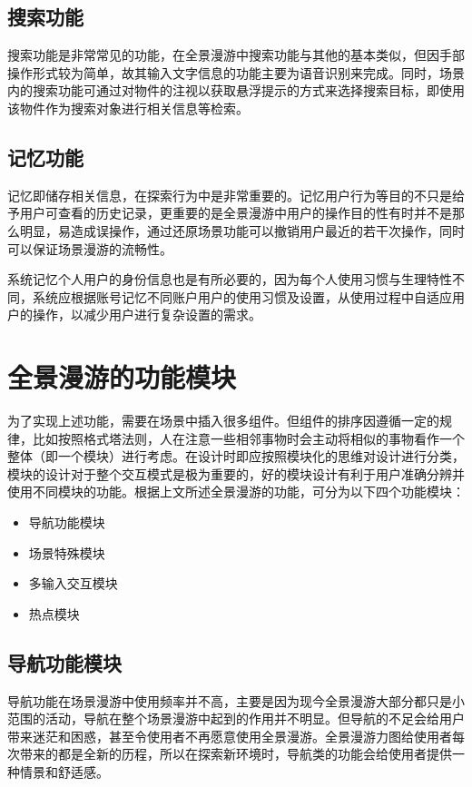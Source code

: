 \subsection{搜索功能}
搜索功能是非常常见的功能，在全景漫游中搜索功能与其他的基本类似，但因手部操作形式较为简单，故其输入文字信息的功能主要为语音识别来完成。同时，场景内的搜索功能可通过对物件的注视以获取悬浮提示的方式来选择搜索目标，即使用该物件作为搜索对象进行相关信息等检索。

\subsection{记忆功能}
记忆即储存相关信息，在探索行为中是非常重要的。记忆用户行为等目的不只是给予用户可查看的历史记录，更重要的是全景漫游中用户的操作目的性有时并不是那么明显，易造成误操作，通过还原场景功能可以撤销用户最近的若干次操作，同时可以保证场景漫游的流畅性。

系统记忆个人用户的身份信息也是有所必要的，因为每个人使用习惯与生理特性不同，系统应根据账号记忆不同账户用户的使用习惯及设置，从使用过程中自适应用户的操作，以减少用户进行复杂设置的需求。


\section{全景漫游的功能模块}
为了实现上述功能，需要在场景中插入很多组件。但组件的排序因遵循一定的规律，比如按照格式塔法则，人在注意一些相邻事物时会主动将相似的事物看作一个整体（即一个模块）进行考虑。在设计时即应按照模块化的思维对设计进行分类，模块的设计对于整个交互模式是极为重要的，好的模块设计有利于用户准确分辨并使用不同模块的功能。根据上文所述全景漫游的功能，可分为以下四个功能模块：
\begin{itemize}
	\item 导航功能模块
	\item 场景特殊模块
	\item 多输入交互模块
	\item 热点模块
\end{itemize}

\subsection{导航功能模块}
导航功能在场景漫游中使用频率并不高，主要是因为现今全景漫游大部分都只是小范围的活动，导航在整个场景漫游中起到的作用并不明显。但导航的不足会给用户带来迷茫和困惑，甚至令使用者不再愿意使用全景漫游。全景漫游力图给使用者每次带来的都是全新的历程，所以在探索新环境时，导航类的功能会给使用者提供一种情景和舒适感。

